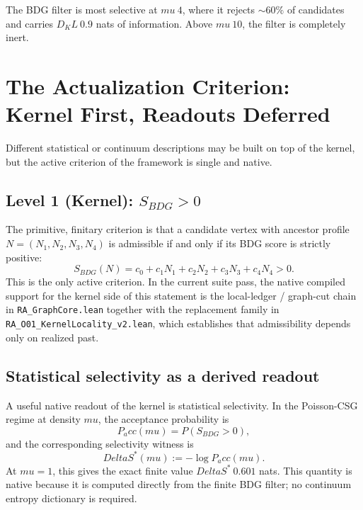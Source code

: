\documentclass[11pt]{article}
\def\Delta{Delta}%
\def\mu{mu}%
\def\mathrm#1{#1}%
\def\mathbf#1{#1}%
\def\mathbb#1{#1}%
\def\approx{~}%
\def\Pacc{P_acc}%
\def\Dkl{D_KL}%
\newcommand{\Pacc}{P_{\mathrm{acc}}}
\newcommand{\Dkl}{D_{\mathrm{KL}}}
\begin{document}
The BDG filter is most selective at $\mu\approx 4$, where it rejects $\sim 60\%$ of candidates and carries $\Dkl\approx 0.9$ nats of information. Above $\mu\approx 10$, the filter is completely inert.

\section{The Actualization Criterion: Kernel First, Readouts Deferred}
\label{sec:criterion}

Different statistical or continuum descriptions may be built on top of the kernel, but the active criterion of the framework is single and native.

\subsection{Level 1 (Kernel): $S_{\mathrm{BDG}} > 0$}

The primitive, finitary criterion is that a candidate vertex with ancestor profile $\mathbf{N}=(N_1,N_2,N_3,N_4)$ is admissible if and only if its BDG score is strictly positive:
\begin{equation}
\label{eq:level1}
S_{\mathrm{BDG}}(\mathbf{N}) = c_0 + c_1 N_1 + c_2 N_2 + c_3 N_3 + c_4 N_4 > 0.
\end{equation}
This is the only active criterion. In the current suite pass, the native compiled support for the kernel side of this statement is the local-ledger / graph-cut chain in \texttt{RA\_GraphCore.lean} together with the replacement family in \texttt{RA\_O01\_KernelLocality\_v2.lean}, which establishes that admissibility depends only on realized past.

\subsection{Statistical selectivity as a derived readout}

A useful native readout of the kernel is statistical selectivity. In the Poisson-CSG regime at density $\mu$, the acceptance probability is
\[
\Pacc(\mu)=\mathbb{P}(S_{\mathrm{BDG}}>0),
\]
and the corresponding selectivity witness is
\[
\Delta S^*(\mu):=-\log \Pacc(\mu).
\]
At $\mu=1$, this gives the exact finite value $\Delta S^*\approx 0.601$ nats. This quantity is native because it is computed directly from the finite BDG filter; no continuum entropy dictionary is required.
\end{document}
